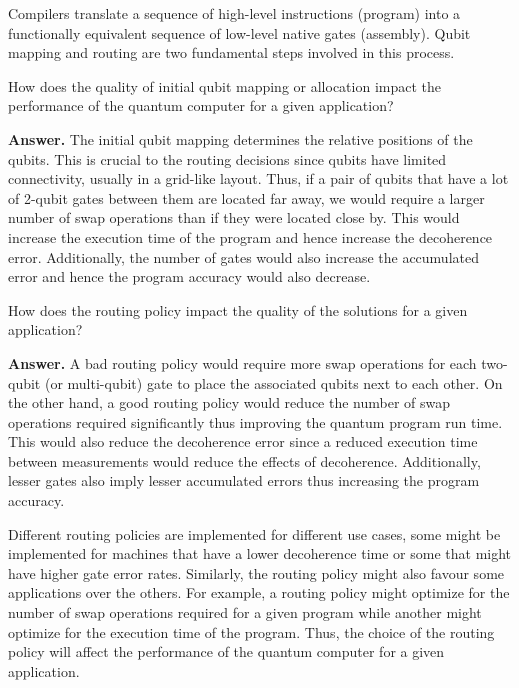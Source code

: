 Compilers translate a sequence of high-level instructions (program) into a functionally equivalent sequence of low-level native gates (assembly). Qubit mapping and routing are two fundamental steps involved in this process.

\tcbline{}

\begin{question}
    How does the quality of initial qubit mapping or allocation impact the performance of the quantum computer for a given application?
\end{question}
\textbf{Answer.} The initial qubit mapping determines the relative positions of the qubits. This is crucial to the routing decisions since qubits have limited connectivity, usually in a grid-like layout. Thus, if a pair of qubits that have a lot of 2-qubit gates between them are located far away, we would require a larger number of swap operations than if they were located close by. This would increase the execution time of the program and hence increase the decoherence error. Additionally, the number of gates would also increase the accumulated error and hence the program accuracy would also decrease.

\tcbline{}

\begin{question}
    How does the routing policy impact the quality of the solutions for a given application?
\end{question}
\textbf{Answer.} A bad routing policy would require more swap operations for each two-qubit (or multi-qubit) gate to place the associated qubits next to each other. On the other hand, a good routing policy would reduce the number of swap operations required significantly thus improving the quantum program run time. This would also reduce the decoherence error since a reduced execution time between measurements would reduce the effects of decoherence. Additionally, lesser gates also imply lesser accumulated errors thus increasing the program accuracy.\par
Different routing policies are implemented for different use cases, some might be implemented for machines that have a lower decoherence time or some that might have higher gate error rates. Similarly, the routing policy might also favour some applications over the others. For example, a routing policy might optimize for the number of swap operations required for a given program while another might optimize for the execution time of the program. Thus, the choice of the routing policy will affect the performance of the quantum computer for a given application.

